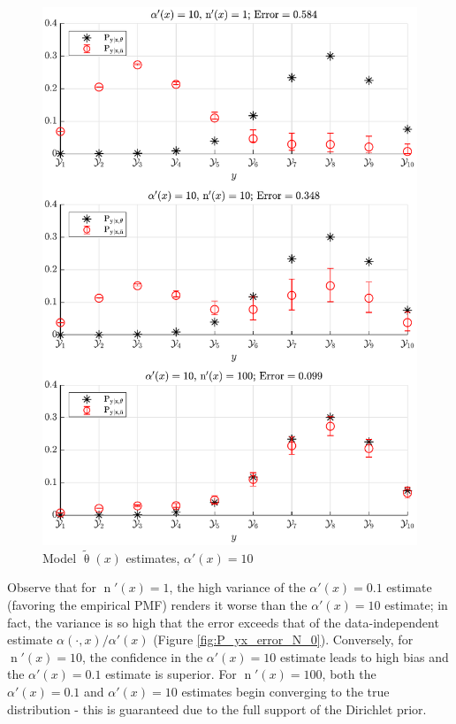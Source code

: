 \documentclass[conference]{IEEEtran}
\DeclareMathOperator{\nrm}{\mathrm{n}}
\begin{document}
\begin{figure}
\centering
\includegraphics[width=1\linewidth]{P_yx_error_a0_10.pdf}
\caption{Model $\tilde{\uptheta}(x)$ estimates, $\alpha'(x) = 10$}
\label{fig:P_yx_error_a0_10}
\end{figure}

Observe that for $\nrm'(x) = 1$, the high variance of the $\alpha'(x) = 0.1$ estimate (favoring the empirical PMF) renders it worse than the $\alpha'(x) = 10$ estimate; in fact, the variance is so high that the error exceeds that of the data-independent estimate $\alpha(\cdot,x) / \alpha'(x)$ (Figure \ref{fig:P_yx_error_N_0}). Conversely, for $\nrm'(x) = 10$, the confidence in the $\alpha'(x) = 10$ estimate leads to high bias and the $\alpha'(x) = 0.1$ estimate is superior. For $\nrm'(x) = 100$, both the $\alpha'(x) = 0.1$ and $\alpha'(x) = 10$ estimates begin converging to the true distribution - this is guaranteed due to the full support of the Dirichlet prior.
\end{document}
